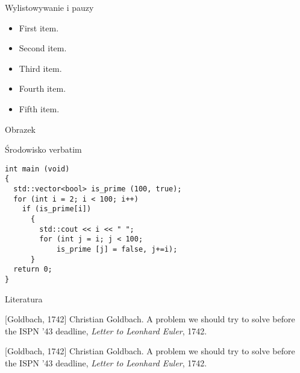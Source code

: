 \documentclass[aspectratio=169]{beamer}
\begin{document}
\begin{frame}{Wylistowywanie i pauzy}
  \begin{itemize}
  \item {
    First item.
    \pause %
  }
  \item {   
    Second item.
  }
  \item<3-> {
    Third item.
  }
  \item<4-> {
    Fourth item.
  }
  \item<5-> {
    Fifth item. 
  }
  \end{itemize}
\end{frame}


\begin{frame}{Obrazek}
%
\end{frame}

\begin{frame}{Środowisko verbatim}
	\begin{verbatim}
int main (void)
{
  std::vector<bool> is_prime (100, true);
  for (int i = 2; i < 100; i++)
    if (is_prime[i])
      {
        std::cout << i << " ";
        for (int j = i; j < 100;
            is_prime [j] = false, j+=i);
      }
  return 0;
}
\end{verbatim}
\end{frame}



\begin{frame}{Literatura}
\begin{thebibliography}{10}
\beamertemplatebookbibitems
{}[Goldbach, 1742]
  Christian Goldbach.
  \newblock A problem we should try to solve before the ISPN '43 deadline,
  \newblock \emph{Letter to Leonhard Euler}, 1742.

\beamertemplatearticlebibitems
{}[Goldbach, 1742]
  Christian Goldbach.
  \newblock A problem we should try to solve before the ISPN '43 deadline,
  \newblock \emph{Letter to Leonhard Euler}, 1742.
\end{thebibliography}
\end{frame}
\end{document}
